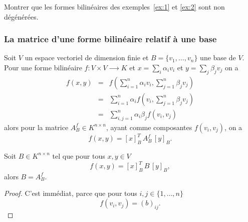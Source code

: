 \begin{exercise}
  \label{ex:3}
  Montrer que les  formes bilinéaires  des exemples~\ref{ex:1} et \ref{ex:2} sont non dégénérées. 
\end{exercise}

\subsubsection{La matrice d'une forme bilinéaire relatif à une base }
\label{sec:la-matrice-dune}

Soit $V$ un espace vectoriel de dimension finie et $B = \{v_1,\dots,v_n\}$ une base de $V$. Pour une forme bilinéaire $f: V × V ⟶ K$ 
 et $x = \sum_i\alpha_i v_i$ et $y = \sum_j \beta_j v_j$ on a 
 \begin{eqnarray*}
   f(x,y) & = & f \left( ∑_{i=1}^n \alpha_i v_i ,   ∑_{j=1}^n \beta_j v_j \right) \\
          & = & ∑_{i=1}^n \alpha_i f \left(  v_i ,   ∑_{j=1}^n \beta_j v_j \right) \\
          & = & ∑_{i,j=1}^n \alpha_i β_j f (  v_i ,  v_j )
    \end{eqnarray*}
alors pour la matrice $A_B^f \in K^{n\times n}$, ayant comme composantes $f(v_i,v_j)$, on a 
\begin{equation}
  \label{eq:64}
  f(x,y) = [x]_B^T \,A_B^f \,  [y]_B.
\end{equation}

\begin{proposition}
  \label{prop:10}
  Soit $B ∈ K^{n ×n}$ tel que pour tous $x,y ∈ V$
  \begin{displaymath}
    f(x,y) = [x]_B^T \,B \,  [y]_B,
  \end{displaymath}
  alors $B = A_B^f$. 
\end{proposition}
\begin{proof}
  C'est immédiat, parce que pour tous $i,j ∈ \{1,\dots,n\}$
\begin{displaymath}
  f(v_i,v_j) = (b)_{ij}. 
\end{displaymath}
\end{proof}


